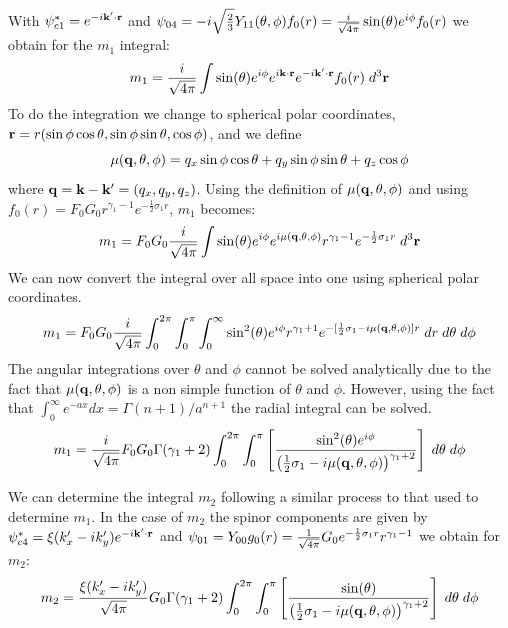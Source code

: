     With $\psi_{c 1}^{*} = e^{-i \mathbf{k'} \cdot \mathbf{r} }$ and 
    $\psi_{0 4} = -i\sqrt{\frac{2}{3}} Y_{11}(\theta,\phi) f_0(r)
                  =  \frac{i}{\sqrt{4 \pi}} \sin(\theta) e^{i \phi} f_0(r)$
    we obtain for the $m_1$ integral:
    \[
    m_1 = \frac{i}{\sqrt{4\pi}} \int \sin(\theta) 
          e^{i \phi} e^{i \mathbf{k} \cdot \mathbf{r} } e^{-i \mathbf{k'} \cdot \mathbf{r} } f_0(r) \; d^3 \mathbf{r}
    \]
    To do the integration we change to spherical polar coordinates,
    $\mathbf{r} = r (\sin\phi \cos\theta,\sin\phi \sin\theta, \cos\phi)$, and we
    define 
    \begin{equation}
        \mu(\mathbf{q},\theta,\phi) = q_x \sin\phi \cos\theta + 
               q_y \sin\phi \sin\theta +
               q_z \cos\phi
    \end{equation}
    where $\mathbf{q} = \mathbf{k} - \mathbf{k'} = (q_x,q_y,q_z)$.
    Using the definition of $\mu(\mathbf{q},\theta,\phi)$ and using 
    $f_0(r) = F_0 G_0 r^{\gamma_1 - 1} e^{-\frac{1}{2}\sigma_1 r}$, $m_1$
becomes:
    \[
    m_1 = F_0 G_0 \frac{i}{\sqrt{4\pi}} \int
          \sin(\theta) e^{i\phi} e^{i\mu(\mathbf{q},\theta,\phi)} r^{\gamma_1 - 1} 
          e^{-\frac{1}{2}\sigma_1 r} \; d^3 \mathbf{r}
    \]
    We can now convert the integral over all space into one using spherical
    polar coordinates.
    \[
    m_1 = F_0 G_0 \frac{i}{\sqrt{4\pi}}
          \int_{0}^{2\pi}
          \int_{0}^{\pi}
          \int_{0}^{\infty}
            \sin^2(\theta) e^{i\phi} r^{\gamma_1 + 1}
            e^{-[ \frac{1}{2}\sigma_1 - i \mu(\mathbf{q},\theta,\phi) ] r }
          \; dr \; d\theta \; d\phi
    \]
    The angular integrations over $\theta$ and $\phi$ cannot be solved
    analytically due to the fact that $\mu(\mathbf{q},\theta,\phi)$ is a non simple function 
    of $\theta$ and $\phi$. However, using the fact that
    \(
        \int_0^\infty e^{-ax} dx = \Gamma(n+1)/a^{n+1}
    \)
    the radial integral can be solved.
    \[
    m_1 = \frac{i}{\sqrt{4\pi}} F_0 G_0 \Gamma(\gamma_1 + 2)
          \int_{0}^{2\pi}
          \int_{0}^{\pi}
            \left[
                \frac{\sin^2(\theta) e^{i\phi} }{
                    \left(
                        \frac{1}{2} \sigma_1 - i \mu(\mathbf{q},\theta,\phi)
                    \right)^{\gamma_1 + 2}
                }
            \right]
          \; d\theta
          \; d\phi
    \]

    We can determine the integral $m_2$ following a similar process to that used
    to determine $m_1$. In the case of $m_2$ the spinor components are given by
    $\psi_{c 4}^{*} = \xi(k'_x - ik'_y)e^{-i \mathbf{k'} \cdot \mathbf{r} }$ and 
    $\psi_{0 1} = Y_{00}g_0(r) 
                  = \frac{1}{\sqrt{4\pi}} G_0
                     e^{-\frac{1}{2}\sigma_1 r} r^{\gamma_1 - 1}$
    we obtain for $m_2$:
    \[
    m_2 = \frac{\xi(k'_x -ik'_y)}{\sqrt{4\pi}} G_0 \Gamma(\gamma_1 + 2)
          \int_{0}^{2\pi}
          \int_{0}^{\pi}
            \left[
                \frac{\sin(\theta) }{
                    \left(
                        \frac{1}{2} \sigma_1 - i \mu(\mathbf{q},\theta,\phi)
                    \right)^{\gamma_1 + 2}
                }
            \right]
          \; d\theta
          \; d\phi
    \]
    
